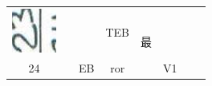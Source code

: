 \documentclass[10pt]{article}
\begin{document}
\begin{center}
\begin{tabular}{|c|c|c|c|c|c|c|c|c|c|}
{} &  &  &  \\
\hline
\includegraphics[max width=\textwidth]{2025_02_27_dd68c3d38de88f0516d9g-053(4)}
 &  &  & TEB & \multicolumn{3}{|l|}{\multirow[t]{2}{*}{最}} &  &  &  \\
\hline
24 &  & EB & ror &  &  &  & V1 &  &  \\
\hline

\end{tabular}
\end{center}
\end{document}
